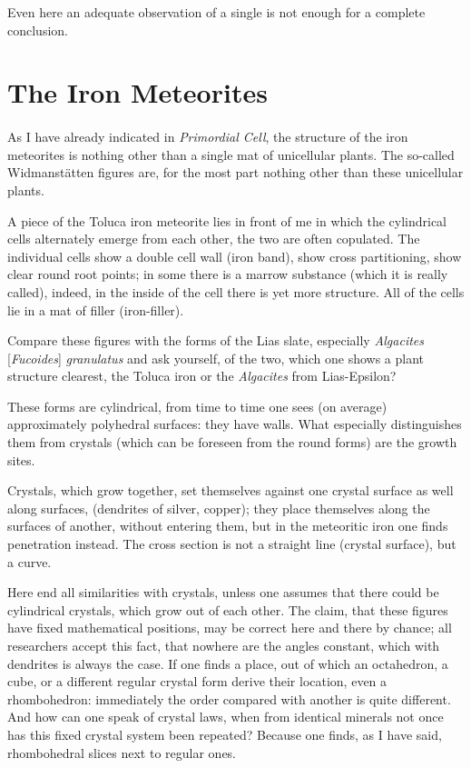 \documentclass[a4paper, 12pt, oneside]{article}
\begin{document}
Even here an adequate observation of a single is not enough for a complete conclusion.
\clearpage
\section{The Iron Meteorites}
\paragraph{}
As I have already indicated in \emph{Primordial Cell}, the structure of the iron meteorites is nothing other than a single mat of unicellular plants. The so-called Widmanstätten figures are, for the most part nothing other than these unicellular plants.

A piece of the Toluca iron meteorite lies in front of me in which the cylindrical cells alternately emerge from each other, the two are often copulated. The individual cells show a double cell wall (iron band), show cross partitioning, show clear round root points; in some there is a marrow substance (which it is really called), indeed, in the inside of the cell there is yet more structure. All of the cells lie in a mat of filler (iron-filler).

Compare these figures with the forms of the Lias slate, especially \emph{Algacites} [\emph{Fucoides}] \emph{granulatus} and ask yourself, of the two, which one shows a plant structure clearest, the Toluca iron or the \emph{Algacites} from Lias-Epsilon?

These forms are cylindrical, from time to time one sees (on average) approximately polyhedral surfaces: they have walls. What especially distinguishes them from crystals (which can be foreseen from the round forms) are the growth sites.

Crystals, which grow together, set themselves against one crystal surface as well along surfaces, (dendrites of silver, copper); they place themselves along the surfaces of another, without entering them, but in the meteoritic iron one finds penetration instead. The cross section is not a straight line (crystal surface), but a curve.

Here end all similarities with crystals, unless one assumes that there could be cylindrical crystals, which grow out of each other. The claim, that these figures have fixed mathematical positions, may be correct here and there by chance; all researchers accept this fact, that nowhere are the angles constant, which with dendrites is always the case. If one finds a place, out of which an octahedron, a cube, or a different regular crystal form derive their location, even a rhombohedron: immediately the order compared with another is quite different. And how can one speak of crystal laws, when from identical minerals not once has this fixed crystal system been repeated? Because one finds, as I have said, rhombohedral slices next to regular ones.
\end{document}
